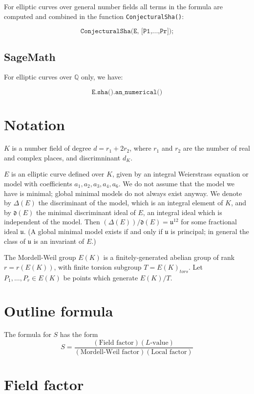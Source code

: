 \documentclass{amsart}
\newcommand{\software}[1]{\textsf{#1}} %
\newcommand{\Sage}{\software{SageMath}{}\ }
\newcommand\Q{\mathbb{Q}}
\begin{document}
For elliptic curves over general number fields all terms in the formula
are computed and combined in the function \texttt{ConjecturalSha()}:

\[
\texttt{ConjecturalSha(E,\ {[}P1,...,Pr{]});}
\]

\subsection{\Sage}\label{sage}

For elliptic curves over \(\Q\) only, we have:

\[
\texttt{E.sha().an\_numerical()}
\]

\section{Notation}\label{notation}

\(K\) is a number field of degree \(d=r_1+2r_2\), where \(r_1\) and
\(r_2\) are the number of real and complex places, and discrimninant
\(d_K\).

\(E\) is an elliptic curve defined over \(K\), given by an integral
Weierstrass equation or model with coefficients \(a_1,a_2,a_3,a_4,a_6\).
We do not assume that the model we have is minimal; global minimal
models do not always exist anyway. We denote by \(\Delta(E)\) the
discriminant of the model, which is an integral element of \(K\), and by
\(\mathfrak{d}(E)\) the minimal discriminant ideal of \(E\), an integral
ideal which is independent of the model. Then
\((\Delta(E))/\mathfrak{d}(E) = \mathfrak{u}^{12}\) for some fractional
ideal \(\mathfrak{u}\). (A global minimal model exists if and only if
\(\mathfrak{u}\) is principal; in general the class of \(\mathfrak{u}\)
is an invariant of \(E\).)

The Mordell-Weil group \(E(K)\) is a finitely-generated abelian group of
rank \(r=r(E(K))\), with finite torsion subgroup \(T=E(K)_{tors}\). Let
\(P_1,\dots,P_r\in E(K)\) be points which generate \(E(K)/T\).

\section{Outline formula}\label{outline-formula}

The formula for \(S\) has the form \[
S = \frac{(\text{Field factor})(\text{$L$-value})}{(\text{Mordell-Weil factor})(\text{Local factor})}
\]

\section{Field factor}\label{field-factor}
\end{document}
